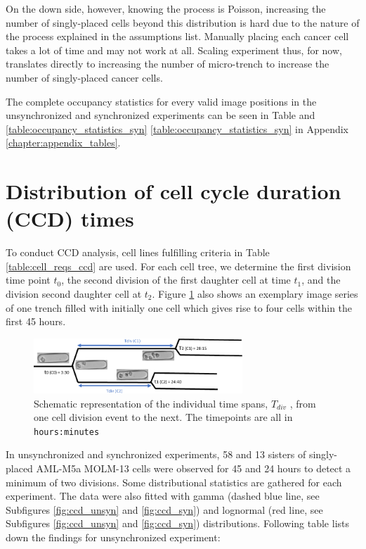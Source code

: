 \documentclass[pdftex,12pt,a4paper]{report}
\begin{document}
On the down side, however, knowing the process is Poisson, increasing the number of singly-placed cells beyond this distribution is hard due to the nature of the process explained in the assumptions list. Manually placing each cancer cell takes a lot of time and may not work at all. Scaling experiment thus, for now, translates directly to increasing the number of micro-trench to increase the number of singly-placed cancer cells.

The complete occupancy statistics for every valid image positions in the unsynchronized and synchronized experiments can be seen in Table and \ref{table:occupancy_statistics_syn} \ref{table:occupancy_statistics_syn} in Appendix \ref{chapter:appendix_tables}.

\section{Distribution of cell cycle duration (CCD) times}
\label{section:cycle:cycle_duration}

To conduct CCD analysis, cell lines fulfilling criteria in Table \ref{table:cell_reqs_ccd} are used. For each cell tree, we determine the first division time point $t_0$, the second division of the first daughter cell at time $t_1$, and the division second daughter cell at $t_2$. Figure \ref{fig:ccd_schema} also shows an exemplary image series of one trench filled with initially one cell which gives rise to four cells within the first 45 hours. 

\begin{figure}[H]
\centering
\includegraphics[width=0.7\textwidth]{images/divs/cell_graphics.pdf}
\caption{Schematic representation of the individual time spans, $T_{div}$ , from one cell division event to the next. The timepoints are all in \texttt{hours:minutes}}
\label{fig:ccd_schema}
\end{figure}

In unsynchronized and synchronized experiments, 58 and 13 sisters of singly-placed AML-M5a MOLM-13 cells were observed for 45 and 24 hours to detect a minimum of two divisions. Some distributional statistics are gathered for each experiment. The data were also fitted with gamma (dashed blue line, see Subfigures \ref{fig:ccd_unsyn} and \ref{fig:ccd_syn}) and lognormal (red line, see Subfigures \ref{fig:ccd_unsyn} and \ref{fig:ccd_syn}) distributions.  Following table lists down the findings for unsynchronized experiment:
\end{document}
